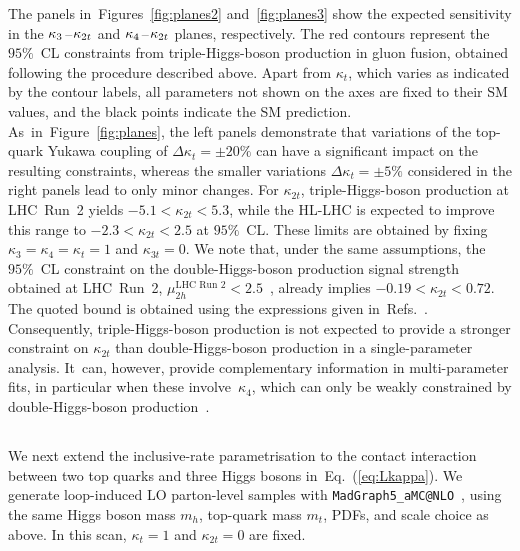 \documentclass{SciPost}
\begin{document}
The panels in~Figures~\ref{fig:planes2} and~\ref{fig:planes3} show the expected sensitivity in the $\kappa_3\hspace{0.25mm}$--$\hspace{0.25mm}\kappa_{2t}$ and $\kappa_4\hspace{0.25mm}$--$\hspace{0.25mm}\kappa_{2t}$ planes, respectively. The red contours represent the $95\%$~CL constraints from triple-Higgs-boson production in gluon fusion, obtained following the procedure described above. Apart from $\kappa_t$, which varies as indicated by the contour labels, all parameters not shown on the axes are fixed to their SM values, and the black points indicate the SM prediction. As~in~Figure~\ref{fig:planes}, the left panels demonstrate that variations of the top-quark Yukawa coupling of $\Delta\kappa_t=\pm20\%$ can have a significant impact on the resulting constraints, whereas the smaller variations $\Delta\kappa_t=\pm5\%$ considered in the right panels lead to only minor changes. For $\kappa_{2t}$, triple-Higgs-boson production at LHC~Run~2 yields $-5.1 < \kappa_{2t} < 5.3$, while the HL-LHC is expected to improve this range to $-2.3 < \kappa_{2t} < 2.5$ at $95\%$~CL. These limits are obtained by fixing $\kappa_3=\kappa_4=\kappa_t=1$ and $\kappa_{3t}=0$. We note that, under the same assumptions, the $95\%$~CL constraint on the double-Higgs-boson production signal strength obtained at LHC~Run~2, $\mu_{2h}^{\text{LHC~Run~2}}<2.5$~\cite{CMS:2026nuu}, already implies $-0.19 < \kappa_{2t} < 0.72$. The quoted bound is obtained using the expressions given in~Refs.~\cite{Buchalla:2018yce,Brivio:2025sib}. Consequently, triple-Higgs-boson production is not expected to provide a stronger constraint on $\kappa_{2t}$ than double-Higgs-boson production in a single-parameter analysis. It~can, however, provide complementary information in multi-parameter fits, in particular when these involve~$\kappa_4$, which can only be weakly constrained by double-Higgs-boson production~\cite{Bizon:2018syu,Borowka:2018pxx,Li:2024iio,Ding:2026qto}.

\subsection{}
\label{sec:kappa3t}

We next extend the inclusive-rate parametrisation to the contact interaction between two top quarks and three Higgs bosons in~Eq.~(\ref{eq:Lkappa}). We generate loop-induced LO parton-level samples with \texttt{MadGraph5\_aMC@NLO}~\cite{Alwall:2014hca}, using the same Higgs boson mass $m_h$, top-quark mass $m_t$, PDFs, and scale choice as above. In this scan, $\kappa_t=1$ and $\kappa_{2t}=0$ are fixed.
\end{document}
